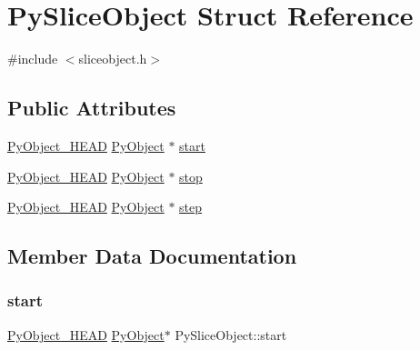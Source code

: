 \hypertarget{struct_py_slice_object}{}\section{Py\+Slice\+Object Struct Reference}
\label{struct_py_slice_object}


{\ttfamily \#include $<$sliceobject.\+h$>$}

\subsection*{Public Attributes}
\begin{DoxyCompactItemize}
\item 
\mbox{\hyperlink{_python27_2object_8h_a0bf35c1f3ea13f925de94d8593db3b7e}{Py\+Object\+\_\+\+H\+E\+AD}} \mbox{\hyperlink{_python27_2object_8h_aadc84ac7aed2cfa6f20c25f62bf3dac7}{Py\+Object}} $\ast$ \mbox{\hyperlink{struct_py_slice_object_a0fb36c5bd889b5ba588454d6f3dfef0d}{start}}
\item 
\mbox{\hyperlink{_python27_2object_8h_a0bf35c1f3ea13f925de94d8593db3b7e}{Py\+Object\+\_\+\+H\+E\+AD}} \mbox{\hyperlink{_python27_2object_8h_aadc84ac7aed2cfa6f20c25f62bf3dac7}{Py\+Object}} $\ast$ \mbox{\hyperlink{struct_py_slice_object_a742f61e756c53435c990658d22f9f463}{stop}}
\item 
\mbox{\hyperlink{_python27_2object_8h_a0bf35c1f3ea13f925de94d8593db3b7e}{Py\+Object\+\_\+\+H\+E\+AD}} \mbox{\hyperlink{_python27_2object_8h_aadc84ac7aed2cfa6f20c25f62bf3dac7}{Py\+Object}} $\ast$ \mbox{\hyperlink{struct_py_slice_object_ae7c2f6781b414d4c94fd25c14ff67a11}{step}}
\end{DoxyCompactItemize}


\subsection{Member Data Documentation}
\mbox{\label{struct_py_slice_object_a0fb36c5bd889b5ba588454d6f3dfef0d}} 
\subsubsection{\texorpdfstring{start}{start}}
{\footnotesize\ttfamily \mbox{\hyperlink{_python27_2object_8h_a0bf35c1f3ea13f925de94d8593db3b7e}{Py\+Object\+\_\+\+H\+E\+AD}} \mbox{\hyperlink{_python27_2object_8h_aadc84ac7aed2cfa6f20c25f62bf3dac7}{Py\+Object}}$\ast$ Py\+Slice\+Object\+::start}


